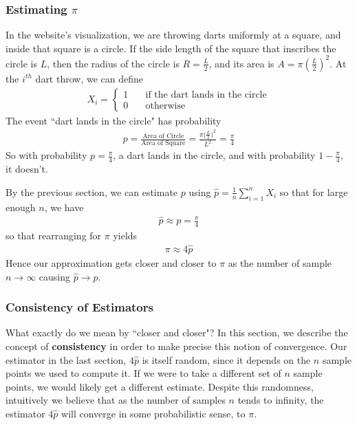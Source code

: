 \documentclass[11pt,letterpaper]{article}
\numberwithin{theorem}{section}
\numberwithin{definition}{section}
\numberwithin{lemma}{section}
\numberwithin{corollary}{section}
\numberwithin{proposition}{section}
\theoremstyle{definition}
\numberwithin{remark}{section}
\numberwithin{claim}{section}
\numberwithin{observation}{section}
\numberwithin{fact}{section}
\numberwithin{assumption}{section}
\numberwithin{example}{section}
\numberwithin{exercise}{section}
\begin{document}
\subsubsection{Estimating $\pi$}
In the website's visualization, we are throwing darts uniformly at a square, and inside that square is a circle. If the side length of the square that inscribes the circle is $L$, then the radius of the circle is $R = \frac{L}{2}$, and its area is $A = \pi(\frac{L}{2})^2$. At the $i^{th}$ dart throw, we can define 
\begin{align*}
X_i = \begin{cases}
1 \hspace{1em} &\text{if the dart lands in the circle} \\
0 &\text{otherwise}
\end{cases}
\end{align*}
The event ``dart lands in the circle" has probability
\begin{align*}
p = \frac{\text{Area of Circle}}{\text{Area of Square}} = \frac{\pi \Big(\frac{L}{2} \Big)^2}{L^2} = \frac{\pi}{4}
\end{align*}
So with probability $p = \frac{\pi}{4}$, a dart lands in the circle, and with probability $1-\frac{\pi}{4}$, it doesn't.

By the previous section, we can estimate $p$ using $\hat{p} = \frac{1}{n}\sum_{i=1}^n X_i$ so that for large enough $n$, we have
\begin{align*}
\hat{p} \approx p = \frac{\pi}{4} 
\end{align*}
so that rearranging for $\pi$ yields
\begin{align*}
\pi \approx 4 \hat{p} 
\end{align*}
Hence our approximation gets closer and closer to $\pi$ as the number of sample $n \to \infty$ causing $\hat{p} \to p$.

\subsubsection{Consistency of Estimators}
What exactly do we mean by ``closer and closer"? In this section, we describe the concept of \textbf{consistency} in order to make precise this notion of convergence. Our estimator in the last section, $4\hat{p}$ is itself random, since it depends on the $n$ sample points we used to compute it. If we were to take a different set of $n$ sample points, we would likely get a different estimate. Despite this randomness, intuitively we believe that as the number of samples $n$ tends to infinity, the estimator $4\hat{p}$ will converge in some probabilistic sense, to $\pi$. 
\end{document}
